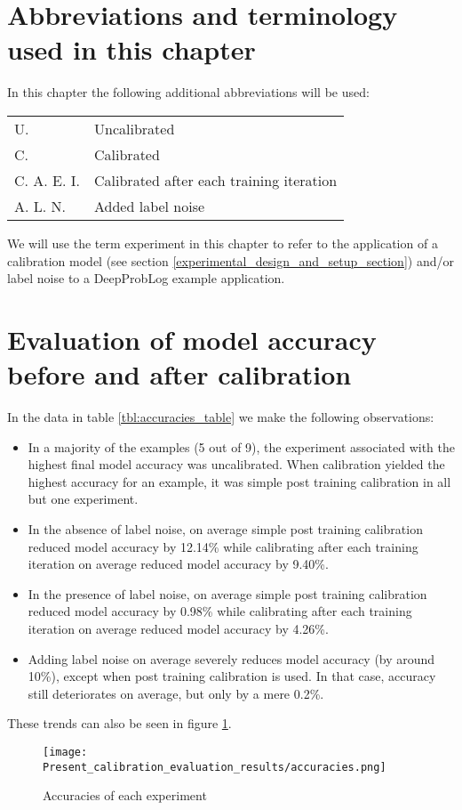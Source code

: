 \label{results_chapter}
\section{Abbreviations and terminology used in this chapter}
In this chapter the following additional abbreviations will be used:
\begin{flushleft}
  \renewcommand{\arraystretch}{1.1}
  \begin{tabularx}{\textwidth}{@{}p{18mm}X@{}}
  U. & Uncalibrated \\
  C. & Calibrated \\
  C. A. E. I. & Calibrated after each training iteration \\
  A. L. N. & Added label noise
  \end{tabularx}
\end{flushleft}

We will use the term experiment in this chapter to refer to the application of a calibration model (see section \ref{experimental_design_and_setup_section}) and/or label noise to a DeepProbLog example application.

\section{Evaluation of model accuracy before and after calibration}
In the data in table \ref{tbl:accuracies_table} we make the following observations:
\begin{itemize}
  \item In a majority of the examples (5 out of 9), the experiment associated with the highest final model accuracy was uncalibrated. When calibration yielded the highest accuracy for an example, it was simple post training calibration in all but one experiment.
  \item In the absence of label noise, on average simple post training calibration reduced model accuracy by 12.14\% while calibrating after each training iteration on average reduced model accuracy by 9.40\%.
  \item In the presence of label noise, on average simple post training calibration reduced model accuracy by 0.98\% while calibrating after each training iteration on average reduced model accuracy by 4.26\%.
  \item Adding label noise on average severely reduces model accuracy (by around 10\%), except when post training calibration is used. In that case, accuracy still deteriorates on average, but only by a mere 0.2\%.
\end{itemize}
These trends can also be seen in figure \ref{fig:accuracies}.

\begin{figure}[htbp!]
  \centering
  \texttt{[image: Present\_calibration\_evaluation\_results/accuracies.png]}
  \caption[Accuracies of each experiment]{Accuracies of each experiment}
  \label{fig:accuracies}
\end{figure}
\newpage

